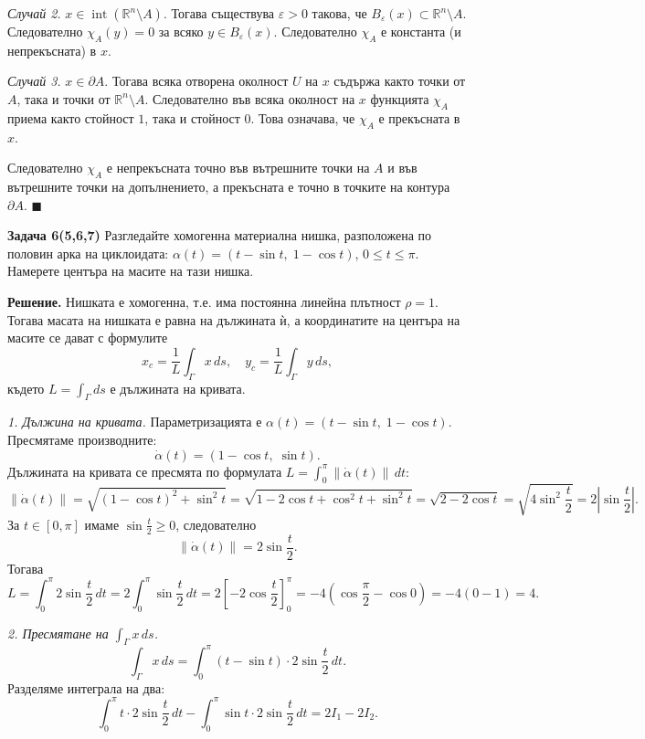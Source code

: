 \documentclass[10pt]{article}
\begin{document}
\textit{Случай 2.} $x \in \operatorname{int}(\mathbb{R}^n \setminus A)$. 
Тогава съществува $\varepsilon > 0$ такова, че $B_\varepsilon(x) \subset \mathbb{R}^n \setminus A$. Следователно $\chi_A(y) = 0$ за всяко $y \in B_\varepsilon(x)$. Следователно $\chi_A$ е константа (и непрекъсната) в $x$.

\textit{Случай 3.} $x \in \partial A$. 
Тогава всяка отворена околност $U$ на $x$ съдържа както точки от $A$, така и точки от $\mathbb{R}^n \setminus A$. Следователно във всяка околност на $x$ функцията $\chi_A$ приема както стойност $1$, така и стойност $0$. Това означава, че $\chi_A$ е прекъсната в $x$.

Следователно $\chi_A$ е непрекъсната точно във вътрешните точки на $A$ и във вътрешните точки на допълнението, а прекъсната е точно в точките на контура $\partial A$. $\blacksquare$



\textbf{Задача 6(5,6,7) }Разгледайте хомогенна материална нишка, разположена по половин арка на циклоидата: $\alpha(t) = (t-\sin t,\; 1-\cos t)$, $0 \le t \le \pi$. Намерете центъра на масите на тази нишка.

\textbf{Решение.} 
Нишката е хомогенна, т.е. има постоянна линейна плътност $\rho = 1$. Тогава масата на нишката е равна на дължината ѝ, а координатите на центъра на масите се дават с формулите
\[
x_c = \frac{1}{L} \int_\Gamma x\,ds, \quad y_c = \frac{1}{L} \int_\Gamma y\,ds,
\]
където $L = \int_\Gamma ds$ е дължината на кривата.

\textit{1. Дължина на кривата.}
Параметризацията е $\alpha(t) = (t-\sin t,\; 1-\cos t)$. Пресмятаме производните:
\[
\dot{\alpha}(t) = (1-\cos t,\; \sin t).
\]
Дължината на кривата се пресмята по формулата $L = \int_0^\pi \|\dot{\alpha}(t)\|\,dt$:
\[
\|\dot{\alpha}(t)\| = \sqrt{(1-\cos t)^2 + \sin^2 t} = \sqrt{1 - 2\cos t + \cos^2 t + \sin^2 t} = \sqrt{2 - 2\cos t} = \sqrt{4\sin^2\frac{t}{2}} = 2\left|\sin\frac{t}{2}\right|.
\]
За $t \in [0,\pi]$ имаме $\sin\frac{t}{2} \ge 0$, следователно
\[
\|\dot{\alpha}(t)\| = 2\sin\frac{t}{2}.
\]
Тогава
\[
L = \int_0^\pi 2\sin\frac{t}{2}\,dt = 2\int_0^\pi \sin\frac{t}{2}\,dt = 2\left[-2\cos\frac{t}{2}\right]_0^\pi = -4\left(\cos\frac{\pi}{2} - \cos0\right) = -4(0 - 1) = 4.
\]

\textit{2. Пресмятане на $\int_\Gamma x\,ds$.}
\[
\int_\Gamma x\,ds = \int_0^\pi (t-\sin t) \cdot 2\sin\frac{t}{2}\,dt.
\]
Разделяме интеграла на два:
\[
\int_0^\pi t \cdot 2\sin\frac{t}{2}\,dt - \int_0^\pi \sin t \cdot 2\sin\frac{t}{2}\,dt = 2I_1 - 2I_2.
\]
\end{document}
